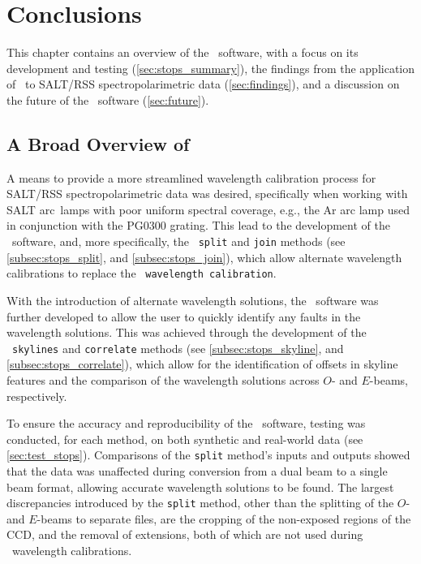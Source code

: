 \chapter{Conclusions} \label{ch:05}

This chapter contains an overview of the \stops\ software, with a focus on its development and testing (\autoref{sec:stops_summary}), the findings from the application of \stops\ to \gls{SALT}/\gls{RSS} spectro\-polarimetric data (\autoref{sec:findings}), and a discussion on the future of the \stops\ software (\autoref{sec:future}).

\section[A Broad Overview of \textsc{stops}]{A Broad Overview of \stops} \label{sec:stops_summary}

A means to provide a more streamlined wavelength calibration process for \gls{SALT}/\gls{RSS} spectropolarimetric data was desired, specifically when working with \gls{SALT} arc~lamps with poor uniform spectral coverage, e.g., the \gls{Ar} arc lamp used in conjunction with the PG$0300$ grating.
This lead to the development of the \stops\ software, and, more specifically, the \stops\ \texttt{split} and \texttt{join} methods (see \autoref{subsec:stops_split}, and \ref{subsec:stops_join}), which allow alternate wavelength calibrations to replace the \polsalt\ \texttt{wavelength calibration}.

With the introduction of alternate wavelength solutions, the \stops\ software was further developed to allow the user to quickly identify any faults in the wavelength solutions.
This was achieved through the development of the \stops\ \texttt{skylines} and \texttt{correlate} methods (see \autoref{subsec:stops_skyline}, and \ref{subsec:stops_correlate}), which allow for the identification of offsets in skyline features and the comparison of the wavelength solutions across $O$- and $E$-beams, respectively.

To ensure the accuracy and reproducibility of the \stops\ software, testing was conducted, for each method, on both synthetic and real-world data (see \autoref{sec:test_stops}).
Comparisons of the \texttt{split} method's inputs and outputs showed that the data was unaffected during conversion from a dual beam to a single beam format, allowing accurate wavelength solutions to be found.
The largest discrepancies introduced by the \texttt{split} method, other than the splitting of the $O$- and $E$-beams to separate files, are the cropping of the non-exposed regions of the \gls{CCD}, and the removal of extensions, both of which are not used during \iraf\ wavelength calibrations.


